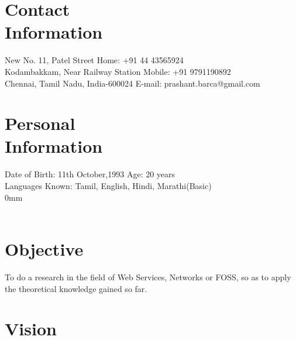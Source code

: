 \documentclass[margin,line]{resume}
\begin{document}
\begin{resume}

    \section{\mysidestyle Contact\\Information}

    New No. 11, Patel Street                            \hfill Home: +91 44 43565924          \vspace{0mm}\\\vspace{0mm}%
    Kodambakkam, Near Railway Station                          \hfill Mobile: +91 9791190892          \vspace{0mm}\\\vspace{0mm}%
    Chennai, Tamil Nadu, India-600024      \hfill E-mail: prashant.barca@gmail.com  \vspace{0mm}\\\vspace{-4.5mm}%

	\section{\mysidestyle Personal\\Information}

Date of Birth: 11th October,1993      \hfill Age: 20 years \vspace{0mm}\\\vspace{0mm}%
Languages Known: Tamil, English, Hindi, Marathi(Basic) \vspace{0mm}\\\vspace
{0mm}%
    \\\\\section{\mysidestyle Objective}

    To do a research in the field of Web Services, Networks or FOSS, so as to apply the theoretical knowledge gained so far.
    \section{\mysidestyle Vision}


\end{resume}
\end{document}
